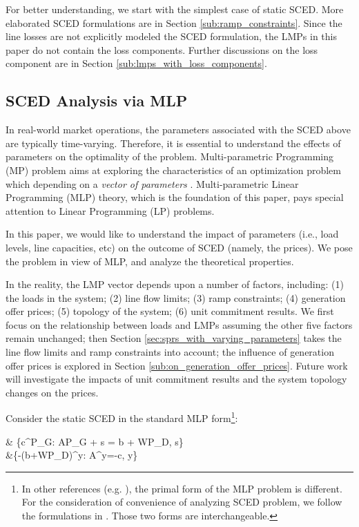 \documentclass[letterpaper, 11pt]{article}
\theoremstyle{plain}
\theoremstyle{definition}
\begin{document}
For better understanding, we start with the simplest case of
static SCED. More elaborated SCED formulations are in Section
\ref{sub:ramp_constraints}. Since the line losses are not explicitly modeled the
SCED formulation, the LMPs in this paper do not contain the
loss components. Further discussions on the loss component
are in Section \ref{sub:lmps_with_loss_components}.


\subsection{SCED Analysis via MLP} \label{sub:SCED_analysis_via_MLP}
In real-world market operations, the parameters associated with the SCED above are typically time-varying. Therefore, it is essential to 
understand the effects of parameters on the optimality of the problem. Multi-parametric Programming (MP) problem aims at exploring the characteristics of an optimization problem which depending on a \emph{vector of parameters} \cite{Borrelli2003}. Multi-parametric Linear Programming (MLP) theory, which is the foundation of this paper, pays special attention to Linear Programming (LP) problems.


In this paper, we would like to understand the impact of parameters (i.e., load levels, line capacities, etc) on the outcome of SCED (namely, the prices). We pose the problem in view of MLP, and analyze the theoretical properties.


In the reality, the LMP vector depends upon a number of factors, including: (1) the loads in the system; (2) line flow limits; (3) ramp constraints; (4) generation offer prices; (5) topology of the system; (6) unit commitment results. We first focus on the relationship between loads and LMPs assuming the other five factors remain unchanged; then Section \ref{sec:sprs_with_varying_parameters} takes the line flow limits and ramp constraints into account; the influence of generation offer prices is explored in Section \ref{sub:on_generation_offer_prices}. Future work will investigate the impacts of unit commitment results and the system topology changes on the prices.


Consider the static SCED in the standard MLP form\footnote{In other references (e.g. \cite{Adler1992a, Gal1972}), the primal form of the MLP problem is different. For the consideration of convenience of analyzing SCED problem, we follow the formulations in \cite{Borrelli2003}. Those two forms are interchangeable.}:

   & \min\{c^\intercal P_G: AP_G + s = b + WP_D, s\} \\
  \label{eqn:SCED_MLP_Dual}
   &\max\{-(b+WP_D)^\intercal y: A^\intercal y=-c, y\} 
\end{document}
